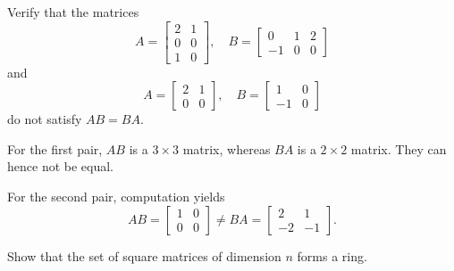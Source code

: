 Verify that the matrices
\[
A = \begin{bmatrix} 2 & 1 \\ 0 & 0 \\ 1 & 0 \end{bmatrix},\quad B = \begin{bmatrix} 0 & 1 & 2 \\ -1 & 0 & 0 \end{bmatrix}
\]
and
\[
A = \begin{bmatrix} 2 & 1 \\ 0 & 0 \end{bmatrix},\quad B = \begin{bmatrix} 1 & 0 \\ -1 & 0 \end{bmatrix}
\]
do not satisfy \(AB = BA\).

\begin{solution}
For the first pair, \(AB\) is a \(3 \times 3\) matrix, whereas \(BA\) is a \(2 \times 2\) matrix.
They can hence not be equal.

For the second pair, computation yields
\[
AB = \begin{bmatrix} 1 & 0 \\ 0 & 0 \end{bmatrix} \neq BA = \begin{bmatrix} 2 & 1 \\ -2 & -1 \end{bmatrix}.
\]
\end{solution}

Show that the set of square matrices of dimension \(n\) forms a ring.

